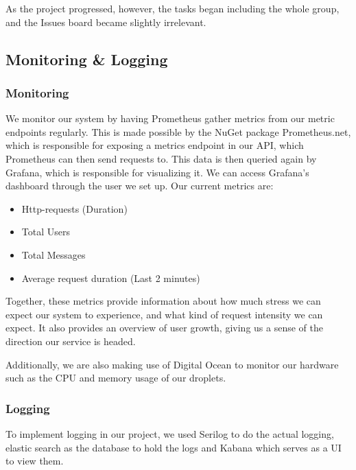 \noindent As the project progressed, however, the tasks began including the whole group, and the Issues board became slightly irrelevant.

\subsection{Monitoring \& Logging}

\subsubsection{Monitoring} \label{Monitoring}

We monitor our system by having Prometheus gather metrics from our metric endpoints regularly. This is made possible by the NuGet package Prometheus.net, which is responsible for exposing a metrics endpoint in our API, which Prometheus can then send requests to. This data is then queried again by Grafana, which is responsible for visualizing it. We can access Grafana's dashboard through the user we set up. Our current metrics are:

\begin{itemize}
    \item Http-requests (Duration)
    \item Total Users
    \item Total Messages
    \item Average request duration (Last 2 minutes)
\end{itemize}

\noindent Together, these metrics provide information about how much stress we can expect our system to experience, and what kind of request intensity we can expect. It also provides an overview of user growth, giving us a sense of the direction our service is headed. 

Additionally, we are also making use of Digital Ocean to monitor our hardware such as the CPU and memory usage of our droplets.

\subsubsection{Logging} \label{Logging}

To implement logging in our project, we used Serilog to do the actual logging, elastic search as the database to hold the logs and Kabana which serves as a UI to view them.

